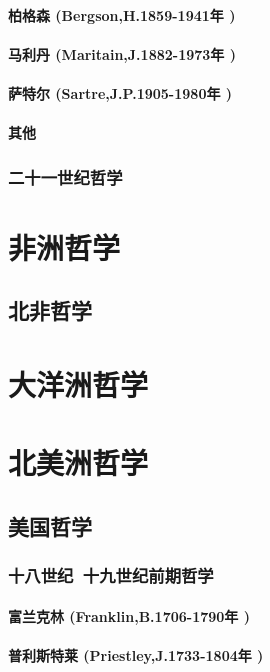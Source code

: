 \documentclass[UTF8]{../RepresentationUniverse}
\begin{document}
    \paragraph{柏格森 (Bergson,H.1859-1941年 )}
    \paragraph{马利丹 (Maritain,J.1882-1973年 )}
    \paragraph{萨特尔 (Sartre,J.P.1905-1980年 )}
    \paragraph{其他}
\subsubsection{二十一世纪哲学}


\section{非洲哲学}
\subsection{北非哲学}


\section{大洋洲哲学}

\section{北美洲哲学}
\subsection{美国哲学}
\subsubsection{十八世纪~十九世纪前期哲学}
    \paragraph{富兰克林 (Franklin,B.1706-1790年 )}
    \paragraph{普利斯特莱 (Priestley,J.1733-1804年 )}
\end{document}
